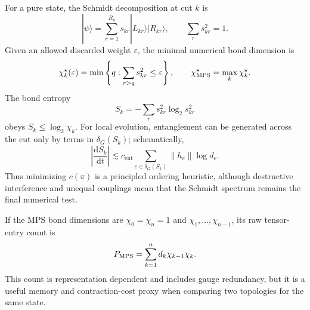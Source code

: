 \documentclass[11pt,a4paper]{article}
\theoremstyle{plain}
\theoremstyle{definition}
\theoremstyle{remark}
\begin{document}
For a pure state, the Schmidt decomposition at cut $k$ is
\begin{equation}
 |\psi\rangle=\sum_{r=1}^{R_k}s_{k r}
 |L_{k r}\rangle|R_{k r}\rangle,
 \qquad \sum_r s_{k r}^2=1.
 \label{eq:tn-schmidt}
\end{equation}
Given an allowed discarded weight $\varepsilon$, the minimal numerical
bond dimension is
\begin{equation}
 \chi_k^\star(\varepsilon)
 =\min\left\{q:\sum_{r>q}s_{k r}^2\leq\varepsilon\right\},
 \qquad
 \chi_{\rm MPS}^\star=\max_k\chi_k^\star .
 \label{eq:tn-minimal-chi}
\end{equation}
The bond entropy
\begin{equation}
 S_k=-\sum_r s_{k r}^2\log_2 s_{k r}^2
 \label{eq:tn-bond-entropy}
\end{equation}
obeys $S_k\leq\log_2\chi_k$.  For local evolution, entanglement can be
generated across the cut only by terms in $\delta_G(S_k)$; schematically,
\begin{equation}
 \left|\frac{\mathrm d S_k}{\mathrm dt}\right|
 \lesssim c_{\mathrm{ent}}\sum_{e\in\delta_G(S_k)}\|h_e\|\log d_e .
 \label{eq:tn-entanglement-rate-bound}
\end{equation}
Thus minimizing $c(\pi)$ is a principled ordering heuristic, although
destructive interference and unequal couplings mean that the Schmidt
spectrum remains the final numerical test.

If the MPS bond dimensions are $\chi_0=\chi_n=1$ and
$\chi_1,\ldots,\chi_{n-1}$, its raw tensor-entry count is
\begin{equation}
 P_{\rm MPS}=\sum_{k=1}^{n}d_k\chi_{k-1}\chi_k .
 \label{eq:tn-mps-parameters}
\end{equation}
This count is representation dependent and includes gauge redundancy,
but it is a useful memory and contraction-cost proxy when comparing two
topologies for the same state.
\end{document}
